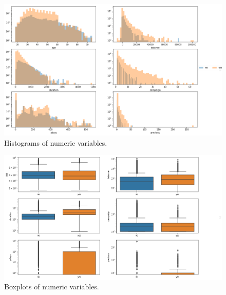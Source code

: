 \documentclass[]{article}
\begin{document}
\begin{figure}
  \centering
    \includegraphics[width=1.0\textwidth]{images/fig1.png}
  \caption{Histograms of numeric variables.}
  \label{fig1}
\end{figure}

\begin{figure}
  \centering
    \includegraphics[width=1.0\textwidth]{images/fig2.png}
  \caption{Boxplots of numeric variables.}
  \label{fig2}
\end{figure}
\end{document}
